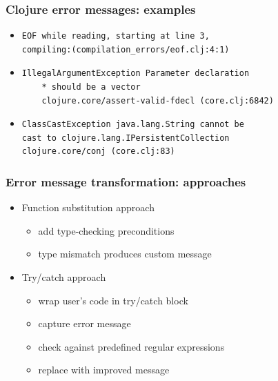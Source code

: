 \documentclass{beamer}
\begin{document}
\begin{frame}[fragile]
\frametitle{Clojure error messages: examples}

\begin{itemize}
	\item \begin{verbatim}
EOF while reading, starting at line 3, 
compiling:(compilation_errors/eof.clj:4:1)
\end{verbatim}

	\item \begin{verbatim}
IllegalArgumentException Parameter declaration
	* should be a vector 
	clojure.core/assert-valid-fdecl (core.clj:6842)
\end{verbatim}

\item \begin{verbatim}
ClassCastException java.lang.String cannot be
cast to clojure.lang.IPersistentCollection 
clojure.core/conj (core.clj:83)
\end{verbatim}

\end{itemize}

\end{frame}

\begin{frame}
\frametitle{Error message transformation: approaches}
	\begin{itemize}
	 	\item Function substitution approach
	 		\begin{itemize}
  	 			\item add type-checking preconditions
  	 			\item type mismatch produces custom message
	 		\end{itemize}
	 
		\item Try/catch approach
			\begin{itemize}
  				\item wrap user's code in try/catch block
  				\item capture error message
  				\item check against predefined regular expressions
  				\item replace with improved message
			\end{itemize}
	\end{itemize}
\end{frame}
\end{document}
